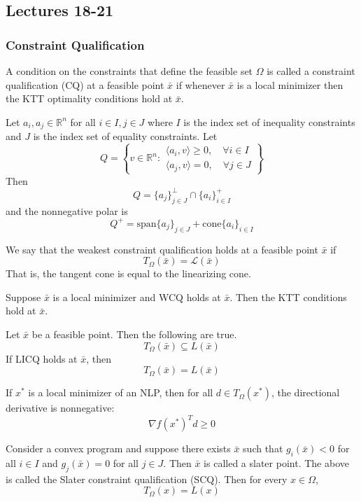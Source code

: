 \subsection{Lectures 18-21}
\subsubsection{Constraint Qualification}
\begin{definition}
    A condition on the constraints that define the feasible set $\Omega$ is called a constraint qualification (CQ) at a feasible point $\bar x$ if whenever $\bar x$ is a local minimizer then the KTT optimality conditions hold at $\bar x$.
\end{definition}
\begin{lemma}
    Let $a_i, a_j \in \mathbb R^n$ for all $i \in I, j \in J$ where $I$ is the index set of inequality constraints and $J$ is the index set of equality constraints. Let
    $$Q = \left\{v \in \mathbb R^n : \substack{\langle a_i, v \rangle \geq 0, \quad \forall i \in I \\ \langle a_j, v \rangle = 0 , \quad \forall j \in J}\right\}$$
    Then
    $$Q = \{a_j\}^\perp_{j \in J} \cap \{a_i\}^+_{i \in I}$$
    and the nonnegative polar is
    $$Q^+ = \text{span}\{a_j\}_{j \in J} + \text{cone}\{a_i\}_{i \in I}$$
\end{lemma}
\begin{definition}
    We say that the weakest constraint qualification holds at a feasible point $\bar x$ if $$T_\Omega(\bar x) = \mathcal L(\bar x)$$
    That is, the tangent cone is equal to the linearizing cone.
\end{definition}
\begin{theorem}[]
    Suppose $\bar x$ is a local minimizer and WCQ holds at $\bar x$. Then the KTT conditions hold at $\bar x$.
\end{theorem}
\begin{theorem}[]
    Let $\bar x$ be a feasible point. Then the following are true.
    $$T_\Omega(\bar x) \subseteq L(\bar x)$$
    If LICQ holds at $\bar x$, then $$T_\Omega(\bar x) = L(\bar x)$$
\end{theorem}
\begin{theorem}[]
    If $x^*$ is a local minimizer of an NLP, then for all $d \in T_\Omega(x^*)$, the directional derivative is nonnegative: $$\nabla f(x^*)^Td \geq 0$$
\end{theorem}
\begin{definition}
    Consider a convex program and suppose there exists $\bar x$ such that $g_i(\bar x) < 0$ for all $i \in I$ and $g_j(\bar x) = 0$ for all $j \in J$. Then $\bar x$ is called a slater point. The above is called the Slater constraint qualification (SCQ). Then for every $x \in \Omega$, $$T_\Omega(x) = L(x)$$
\end{definition}
